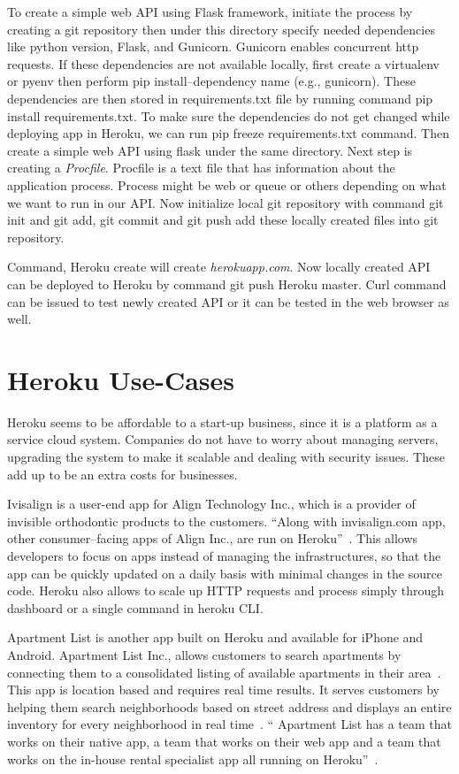  To create a simple web API using Flask framework, initiate the process
 by creating a git repository then under this directory specify needed
 dependencies like python version, Flask, and Gunicorn. Gunicorn
 enables concurrent  http requests. If these
 dependencies are not available locally, first create a virtualenv or
 pyenv then perform pip install--dependency name (e.g., gunicorn). 
 These dependencies are
 then stored in requirements.txt file by running  command pip install 
 requirements.txt. To make sure the dependencies do
 not get changed while deploying app in Heroku, we can run pip freeze
 requirements.txt command. Then create a simple web API using flask under the same
 directory. Next step is creating a \textit{Procfile}. Procfile is a text file
 that has information
 about the application process. Process might be web or queue or others depending on 
 what we want to run in our API. Now initialize local git repository with command
 git init and git add, git commit and git push add these locally created files 
 into git repository.

 Command, Heroku create will create \textit{herokuapp.com}. Now locally created API
 can be deployed to Heroku by command git push Heroku master. Curl command
 can be issued to test newly created API or it can be tested in the web
 browser as well.


\section{Heroku Use-Cases}
 Heroku seems to be affordable to a start-up business, since it is a platform
 as a service cloud system. Companies do not have to worry about managing
 servers, upgrading the system to make it scalable and dealing with security
 issues. These add up to be an extra costs for businesses. 

 Ivisalign is a user-end app for Align Technology Inc., which is a provider of
 invisible orthodontic products to the customers. ``Along with invisalign.com app,
 other consumer--facing apps of Align Inc., are run on
 Heroku''~\cite{hid-sp18-415-www-customers-heroku-com}. This allows developers to focus
 on apps instead of managing the infrastructures, so that the app can be quickly
 updated on a daily basis with minimal changes in the source code. Heroku also
 allows to scale up HTTP requests and process simply through dashboard or a
 single command in heroku CLI. 

 Apartment List is another app built on Heroku and available for iPhone and
 Android. Apartment List Inc., allows customers to search apartments by
 connecting them to a consolidated listing of available apartments in
 their area~\cite{hid-sp18-415-www-customers-heroku-com}. This app is location based
 and requires real time results. It serves customers by helping them search
 neighborhoods based on street address and displays an entire inventory for
 every neighborhood in real time~\cite{hid-sp18-415-www-customers-heroku-com}.
 `` Apartment List has a team that works on their native app, a team
 that works on their web app and a team that works on the in-house rental
 specialist app  all running on Heroku''~\cite{hid-sp18-415-www-customers-heroku-com}.

